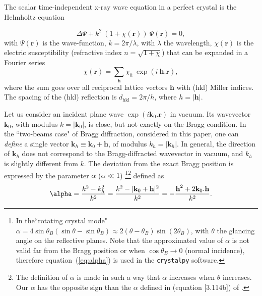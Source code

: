 \documentclass[preprint]{iucr}              %
\begin{document}
The scalar time-independent x-ray wave equation in a perfect crystal is the Helmholtz equation

\begin{equation}
\label{eq:helmholz}
    \Delta \Psi + k^2~(1+\chi(\textbf{r})) ~\Psi(\textbf{r}) = 0,
\end{equation}
with $\Psi(\textbf{r})$ is the wave-function, $k=2\pi/\lambda$, with $\lambda$ the wavelength, $\chi(\textbf{r})$ is the electric susceptibility (refractive index $n=\sqrt{1+\chi}$)
that can be expanded in a Fourier series
\begin{equation}
\label{eq:chi}
    \chi(\textbf{r}) = \sum_{\textbf{h}} \chi_h ~\exp(i~\textbf{h} . \textbf{r}),
\end{equation}
where 
the sum goes over all reciprocal lattice vectors $\textbf{h}$ with (hkl) Miller indices. 
The spacing of the (hkl) reflection is $d_\text{hkl}=2 \pi/h$, where $h=|\textbf{h}|$.

Let us consider an incident plane wave $\exp(i\textbf{k}_0 . \textbf{r})$ in vacuum. Its wavevector $\textbf{k}_0$, with modulus $k=|\textbf{k}_0|$, is close, but not exactly on the Bragg condition.
In the ``two-beams case" of Bragg diffraction, considered in this paper, one can \textit{define} a single vector $\textbf{k}_h \equiv \textbf{k}_0+\textbf{h}$, of modulus  $k_h=|\textbf{k}_h|$.
In general, the direction of $\textbf{k}_h$ does not correspond to the Bragg-diffracted wavevector in vacuum, and $k_h$ is slightly different from $k$.
The deviation from the exact Bragg position is expressed by the parameter $\alpha$ ($\alpha \ll 1$)
 \footnote{In the``rotating crystal mode" $\alpha=4 \sin \theta_B (\sin \theta - \sin \theta_B) \approx 2 (\theta-\theta_B) \sin (2\theta_B)$, with $\theta$ the glancing angle on the reflective planes. Note that the approximated value of $\alpha$ is not valid far from the Bragg position or when $\cos\theta_B \rightarrow 0$ (normal incidence), therefore  equation~(\ref{eq:alpha}) is used in the {\tt crystalpy} software. }\footnote{
 The definition of $\alpha$ is made in such a way that $\alpha$ increases when $\theta$ increases. Our $\alpha$ has the opposite sign than the $\alpha$ defined in (equation [3.114b]) of \cite{ZachariasenBook}. 
 } defined as
\begin{equation}
\label{eq:alpha}
\alpha = \frac{k^2-k_h^2}{k^2} = \frac{k^2-|\textbf k_0 + \textbf h|^2}{k^2} = - \frac{\textbf h^2 + 2 \textbf k_0 . \textbf h}{k^2}.
\end{equation}
\end{document}
